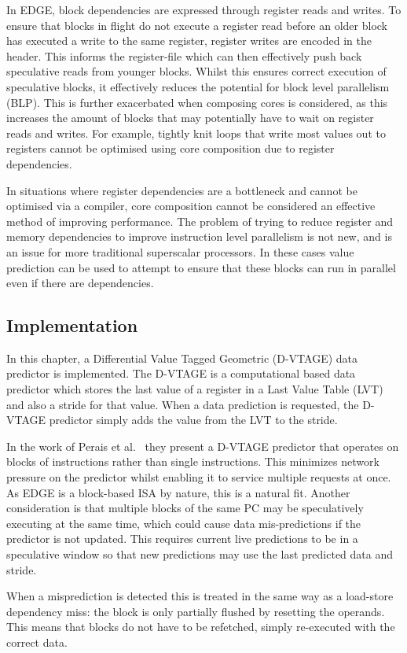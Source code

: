 In EDGE, block dependencies are expressed through register reads and writes.
To ensure that blocks in flight do not execute a register read before an older block has executed a write to the same register, register writes are encoded in the header.
This informs the register-file which can then effectively push back speculative reads from younger blocks.
Whilst this ensures correct execution of speculative blocks, it effectively reduces the potential for block level parallelism (BLP).
This is further exacerbated when composing cores is considered, as this increases the amount of blocks that may potentially have to wait on register reads and writes.
For example, tightly knit loops that write most values out to registers cannot be optimised using core composition due to register dependencies.

In situations where register dependencies are a bottleneck and cannot be optimised via a compiler, core composition cannot be considered an effective method of improving performance.
The problem of trying to reduce register and memory dependencies to improve instruction level parallelism is not new, and is an issue for more traditional superscalar processors.
In these cases value prediction can be used to attempt to ensure that these blocks can run in parallel even if there are dependencies.

\subsection{Implementation}
In this chapter, a Differential Value Tagged Geometric (D-VTAGE) data predictor is implemented.
The D-VTAGE is a computational based data predictor which stores the last value of a register in a Last Value Table (LVT) and also a stride for that value.
When a data prediction is requested, the D-VTAGE predictor simply adds the value from the LVT to the stride.

In the work of Perais et al.~\cite{peraisBeBop2015} they present a D-VTAGE predictor that operates on blocks of instructions rather than single instructions.
This minimizes network pressure on the predictor whilst enabling it to service multiple requests at once.
As EDGE is a block-based ISA by nature, this is a natural fit.
Another consideration is that multiple blocks of the same PC may be speculatively executing at the same time, which could cause data mis-predictions if the predictor is not updated.
This requires current live predictions to be in a speculative window so that new predictions may use the last predicted data and stride.

When a misprediction is detected this is treated in the same way as a load-store dependency miss: the block is only partially flushed by resetting the operands.
This means that blocks do not have to be refetched, simply re-executed with the correct data.


